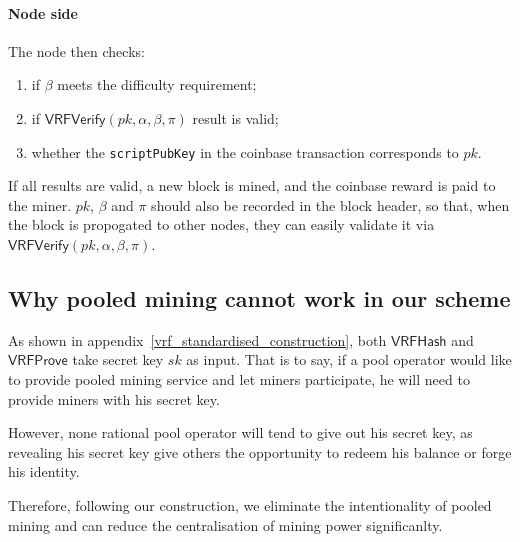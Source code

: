 \paragraph{Node side}
\newblock
\newline
The node then checks:
\begin{enumerate}
    \item if $\beta$ meets the difficulty requirement;
    \item if $\mathsf{VRFVerify}(pk, \alpha, \beta, \pi)$ result is valid;
    \item whether the \texttt{scriptPubKey} in the coinbase transaction corresponds to $pk$.
\end{enumerate}
If all results are valid, a new block is mined, and the coinbase reward is paid to the miner. $pk$, $\beta$ and $\pi$ should also be recorded in the block header, so that, when the block is propogated to other nodes, they can easily validate it via $\mathsf{VRFVerify}(pk, \alpha, \beta, \pi)$.



\subsection{Why pooled mining cannot work in our scheme}
\label{sec:discourage-pool}

As shown in appendix~\ref{vrf_standardised_construction}, both $\mathsf{VRFHash}$ and $\mathsf{VRFProve}$ take secret key $sk$ as input.
That is to say, if a pool operator would like to provide pooled mining service and let miners participate, he will need to provide miners with his secret key.

However, none rational pool operator will tend to give out his secret key, as revealing his secret key give others the opportunity to redeem his balance or forge his identity.

Therefore, following our construction, we eliminate the intentionality of pooled mining and can reduce the centralisation of mining power significanlty.
